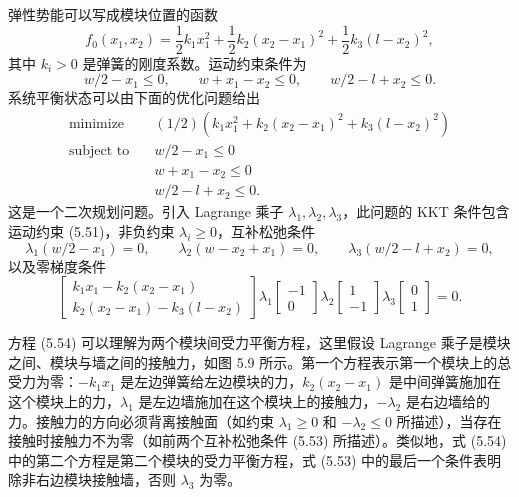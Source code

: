 \documentclass[UTF8, 12pt, fontset=fandol, oneside]{ctexart}
\begin{document}
弹性势能可以写成模块位置的函数
\[
f_0(x_1,x_2)=\frac{1}{2}k_1x_1^2+\frac{1}{2}k_2(x_2-x_1)^2+\frac{1}{2}k_3(l-x_2)^2,
\]
其中 $k_i>0$ 是弹簧的刚度系数。运动约束条件为
\begin{equation}
w/2-x_1\leq 0,\qquad w+x_1-x_2\leq 0,\qquad w/2-l+x_2\leq 0.
\tag{5.51}
\end{equation}
系统平衡状态可以由下面的优化问题给出
\begin{equation}
\begin{aligned}
\text{minimize}\quad & (1/2)(k_1x_1^2+k_2(x_2-x_1)^2+k_3(l-x_2)^2)\\
\text{subject to}\quad & w/2-x_1\leq 0\\
& w+x_1-x_2\leq 0\\
& w/2-l+x_2\leq 0.
\end{aligned}
\tag{5.52}
\end{equation}
这是一个二次规划问题。引入 Lagrange 乘子 $\lambda_1,\lambda_2,\lambda_3$，此问题的 KKT 条件包含运动约束 (5.51)，非负约束 $\lambda_i\geq 0$，互补松弛条件
\begin{equation}
\lambda_1(w/2-x_1)=0,\qquad
\lambda_2(w-x_2+x_1)=0,\qquad
\lambda_3(w/2-l+x_2)=0,
\tag{5.53}
\end{equation}
以及零梯度条件
\begin{equation}
\begin{bmatrix}
k_1x_1-k_2(x_2-x_1)\\
k_2(x_2-x_1)-k_3(l-x_2)
\end{bmatrix}
\lambda_1\begin{bmatrix}-1\\0\end{bmatrix}
\lambda_2\begin{bmatrix}1\\-1\end{bmatrix}
\lambda_3\begin{bmatrix}0\\1\end{bmatrix}
=0.
\tag{5.54}
\end{equation}

方程 (5.54) 可以理解为两个模块间受力平衡方程，这里假设 Lagrange 乘子是模块之间、模块与墙之间的接触力，如图 5.9 所示。第一个方程表示第一个模块上的总受力为零：$-k_1x_1$ 是左边弹簧给左边模块的力，$k_2(x_2-x_1)$ 是中间弹簧施加在这个模块上的力，$\lambda_1$ 是左边墙施加在这个模块上的接触力，$-\lambda_2$ 是右边墙给的力。接触力的方向必须背离接触面（如约束 $\lambda_1\geq 0$ 和 $-\lambda_2\leq 0$ 所描述），当存在接触时接触力不为零（如前两个互补松弛条件 (5.53) 所描述）。类似地，式 (5.54) 中的第二个方程是第二个模块的受力平衡方程，式 (5.53) 中的最后一个条件表明除非右边模块接触墙，否则 $\lambda_3$ 为零。
\end{document}
